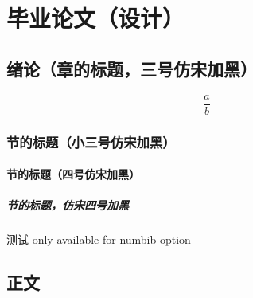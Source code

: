 %
\part{毕业论文（设计）}

\chapter{绪论（章的标题，三号仿宋加黑）}

{}

\begin{equation}
\frac{a}{b}
\end{equation}

\section{节的标题（小三号仿宋加黑）}

\subsection{节的标题（四号仿宋加黑）}

\subsubsection{节的标题，仿宋四号加黑}

测试 only available for numbib option
\chapter{正文}

